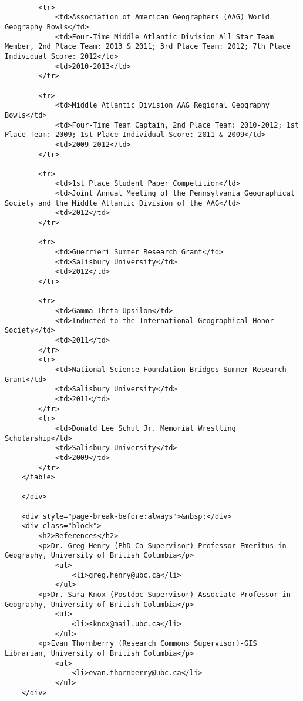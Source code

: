 \documentclass[
]{article}
\begin{document}
\begin{verbatim}
    
        <tr>
            <td>Association of American Geographers (AAG) World Geography Bowls</td>
            <td>Four-Time Middle Atlantic Division All Star Team Member, 2nd Place Team: 2013 & 2011; 3rd Place Team: 2012; 7th Place Individual Score: 2012</td>
            <td>2010-2013</td>
        </tr>
    
        <tr>
            <td>Middle Atlantic Division AAG Regional Geography Bowls</td>
            <td>Four-Time Team Captain, 2nd Place Team: 2010-2012; 1st Place Team: 2009; 1st Place Individual Score: 2011 & 2009</td>
            <td>2009-2012</td>
        </tr>
    
        <tr>
            <td>1st Place Student Paper Competition</td>
            <td>Joint Annual Meeting of the Pennsylvania Geographical Society and the Middle Atlantic Division of the AAG</td>
            <td>2012</td>
        </tr>
    
        <tr>
            <td>Guerrieri Summer Research Grant</td>
            <td>Salisbury University</td>
            <td>2012</td>
        </tr>
    
        <tr>
            <td>Gamma Theta Upsilon</td>
            <td>Inducted to the International Geographical Honor Society</td>
            <td>2011</td>
        </tr>
        <tr>
            <td>National Science Foundation Bridges Summer Research Grant</td>
            <td>Salisbury University</td>
            <td>2011</td>
        </tr>
        <tr>
            <td>Donald Lee Schul Jr. Memorial Wrestling Scholarship</td>
            <td>Salisbury University</td>
            <td>2009</td>
        </tr>
    </table>
    
    </div>
    
    <div style="page-break-before:always">&nbsp;</div> 
    <div class="block">
        <h2>References</h2>
        <p>Dr. Greg Henry (PhD Co-Supervisor)-Professor Emeritus in Geography, University of British Columbia</p>
            <ul>
                <li>greg.henry@ubc.ca</li>
            </ul>
        <p>Dr. Sara Knox (Postdoc Supervisor)-Associate Professor in Geography, University of British Columbia</p>
            <ul>
                <li>sknox@mail.ubc.ca</li>
            </ul>
        <p>Evan Thornberry (Research Commons Supervisor)-GIS Librarian, University of British Columbia</p>
            <ul>
                <li>evan.thornberry@ubc.ca</li>
            </ul>
    </div>
    
    
\end{verbatim}
\end{document}
